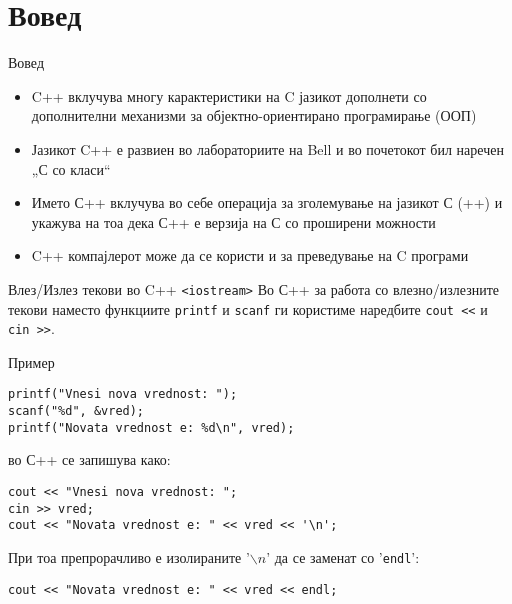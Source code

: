 \section{Вовед}

\begin{frame}{Вовед}
\begin{itemize}
  \item C++ вклучува многу карактеристики на C јазикот дополнети со дополнителни
механизми за објектно-ориентирано програмирање (ООП)
\item Јазикот C++ е развиен во лабораториите на Bell и во почетокот бил наречен
„С со класи“
\item Името С++ вклучува во себе операција за зголемување на јазикот С (++) и
укажува на тоа дека С++ е верзија на С со проширени можности
\item C++ компајлерот може да се користи и за преведување на C програми
\end{itemize}
\end{frame}

\begin{frame}[fragile]{Влез/Излез текови во C++ \texttt{<iostream>}}
Во С++ за работа со
влезно/излезните текови наместо функциите \texttt{printf} и \texttt{scanf} ги
користиме наредбите \texttt{cout <<} и \texttt{cin >>}.
\begin{exampleblock}{Пример}
\begin{lstlisting}
printf("Vnesi nova vrednost: ");
scanf("%d", &vred);
printf("Novata vrednost e: %d\n", vred);
\end{lstlisting}
во С++ се запишува како:
\begin{lstlisting}
cout << "Vnesi nova vrednost: ";
cin >> vred;
cout << "Novata vrednost e: " << vred << '\n';
\end{lstlisting}
При тоа препрорачливо е изолираните '${\backslash n}$' да се заменат со
'\texttt{endl}':
\begin{lstlisting}
cout << "Novata vrednost e: " << vred << endl;
\end{lstlisting}
\end{exampleblock}
\end{frame}

